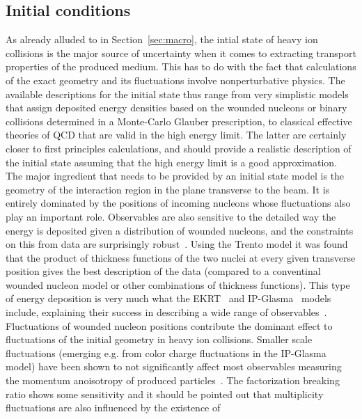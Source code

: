 \subsection{Initial conditions} \label{sec:initialstate}
As already alluded to in Section~\ref{sec:macro}, the intial state of 
  heavy ion collisions is the major source of uncertainty when it comes 
	to extracting transport properties of the produced medium. 
This has to do with the fact that calculations of the exact geometry and 
  its fluctuations involve nonperturbative physics. 
The available descriptions for the initial state thus range from very 
  simplistic models that assign deposited energy densities based on the 
	wounded nucleons or binary collisions determined in a Monte-Carlo 
	Glauber prescription, to classical effective theories of QCD that are 
	valid in the high energy limit. 
The latter are certainly closer to first principles calculations, and 
  should provide a realistic description of the initial state assuming 
	that the high energy limit is a good approximation.
The major ingredient that needs to be provided by an initial state model 
  is the geometry of the interaction region in the plane transverse 
	to the beam. 
It is entirely dominated by the positions of incoming nucleons whose 
  fluctuations also play an important role. 
Observables are also sensitive to the detailed way the energy is deposited 
  given a distribution of wounded nucleons, and the constraints on this 
	from data are surprisingly robust~\cite{Moreland:2018gsh}. 
Using the Trento model it was found that the product of thickness functions 
  of the two nuclei at every given transverse position gives the best description 
	of the data (compared to a conventinal wounded nucleon model or other 
	combinations of thickness functions). 
This type of energy deposition is very much what the EKRT~\cite{Niemi:2015qia} 
  and IP-Glasma~\cite{Schenke:2012wb,Schenke:2012fw} models include, explaining 
	their success in describing a wide range of observables~\cite{Niemi:2015qia,Gale:2012rq}.
Fluctuations of wounded nucleon positions contribute the dominant effect to 
  fluctuations of the initial geometry in heavy ion collisions. 
Smaller scale fluctuations (emerging e.g. from color charge fluctuations 
  in the IP-Glasma model) have been shown to not significantly affect most 
	observables measuring the momentum anoisotropy of produced particles~\cite{Gardim:2017ruc}. 
The factorization breaking ratio shows some sensitivity and it should be pointed 
  out that multiplicity fluctuations are also influenced by the existence of 
